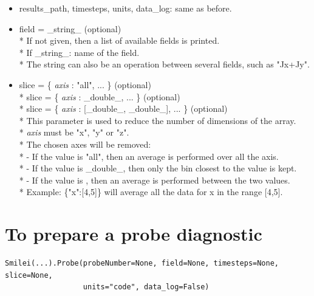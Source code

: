 \documentclass[11pt]{article}
\newcommand{\code}[1]{\colorbox{yellow!15}{\ttfamily #1}}
\newcommand{\val}[1]{{\ttfamily \textit{#1}}}
\begin{document}
\begin{itemize}
\item \code{results\_path}, \code{timesteps}, \code{units}, \code{data\_log}: same as before.
\item \code{field} = \code{\_string\_} (optional)\\*
	If not given, then a list of available fields is printed.\\*
	If \code{\_string\_}: name of the field.\\*
	The string can also be an operation between several fields, such as \code{"Jx+Jy"}.
\item \code{slice} = \code{\{ \val{axis} : "all", ... \}}                 (optional)\\*
	\code{slice} = \code{\{ \val{axis} : \_double\_, ... \}}              (optional)\\*
	\code{slice} = \code{\{ \val{axis} : [\_double\_, \_double\_], ... \}}  (optional)\\*
	This parameter is used to reduce the number of dimensions of the array.\\*
	\val{axis} must be \code{"x"}, \code{"y"} or \code{"z"}.\\*
	 The chosen axes will be removed:\\*
	- If the value is \code{"all"}, then an average is performed over all the axis.\\*
	- If the value is \code{\_double\_}, then only the bin closest to the value is kept.\\*
	- If the value is \code{[\_double\_,\_double\_]}, then an average is performed between the two values.\\*
	Example: \code{\{"x":[4,5]\}} will average all the data for x in the range [4,5].
\end{itemize}
\vspace{0.5cm}


\section{To prepare a probe diagnostic}

\begin{lstlisting}
Smilei(...).Probe(probeNumber=None, field=None, timesteps=None, slice=None,
                  units="code", data_log=False)
\end{lstlisting}
\end{document}
